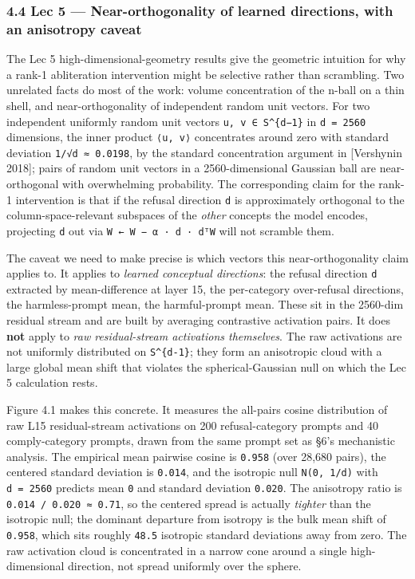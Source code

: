 \documentclass[
  11pt,
]{article}
\begin{document}
\subsubsection{4.4 Lec 5 --- Near-orthogonality of learned directions,
with an anisotropy
caveat}\label{lec-5-near-orthogonality-of-learned-directions-with-an-anisotropy-caveat}

The Lec 5 high-dimensional-geometry results give the geometric intuition
for why a rank-1 abliteration intervention might be selective rather
than scrambling. Two unrelated facts do most of the work: volume
concentration of the n-ball on a thin shell, and near-orthogonality of
independent random unit vectors. For two independent uniformly random
unit vectors \texttt{u,\ v\ ∈\ S\^{}\{d−1\}} in \texttt{d\ =\ 2560}
dimensions, the inner product \texttt{⟨u,\ v⟩} concentrates around zero
with standard deviation \texttt{1/√d\ ≈\ 0.0198}, by the standard
concentration argument in {[}Vershynin 2018{]}; pairs of random unit
vectors in a 2560-dimensional Gaussian ball are near-orthogonal with
overwhelming probability. The corresponding claim for the rank-1
intervention is that if the refusal direction \texttt{d} is
approximately orthogonal to the column-space-relevant subspaces of the
\emph{other} concepts the model encodes, projecting \texttt{d} out via
\texttt{W\ ←\ W\ −\ α\ ·\ d\ ·\ dᵀW} will not scramble them.

The caveat we need to make precise is which vectors this
near-orthogonality claim applies to. It applies to \emph{learned
conceptual directions}: the refusal direction \texttt{d} extracted by
mean-difference at layer 15, the per-category over-refusal directions,
the harmless-prompt mean, the harmful-prompt mean. These sit in the
2560-dim residual stream and are built by averaging contrastive
activation pairs. It does \textbf{not} apply to \emph{raw
residual-stream activations themselves}. The raw activations are not
uniformly distributed on \texttt{S\^{}\{d-1\}}; they form an anisotropic
cloud with a large global mean shift that violates the
spherical-Gaussian null on which the Lec 5 calculation rests.

Figure 4.1 makes this concrete. It measures the all-pairs cosine
distribution of raw L15 residual-stream activations on 200
refusal-category prompts and 40 comply-category prompts, drawn from the
same prompt set as §6's mechanistic analysis. The empirical mean
pairwise cosine is \texttt{0.958} (over 28,680 pairs), the centered
standard deviation is \texttt{0.014}, and the isotropic null
\texttt{N(0,\ 1/d)} with \texttt{d\ =\ 2560} predicts mean \texttt{0}
and standard deviation \texttt{0.020}. The anisotropy ratio is
\texttt{0.014\ /\ 0.020\ ≈\ 0.71}, so the centered spread is actually
\emph{tighter} than the isotropic null; the dominant departure from
isotropy is the bulk mean shift of \texttt{0.958}, which sits roughly
\texttt{48.5} isotropic standard deviations away from zero. The raw
activation cloud is concentrated in a narrow cone around a single
high-dimensional direction, not spread uniformly over the sphere.
\end{document}
